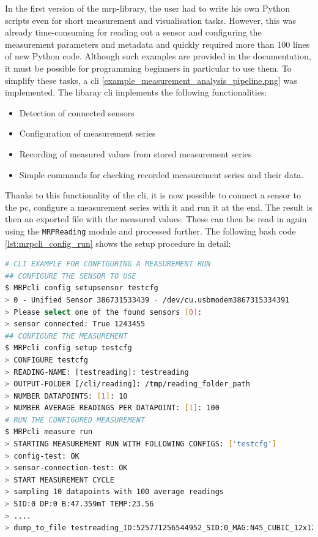 In the first version of the \gls{mrp}-library, the user had to write his
own Python scripts even for short measurement and visualisation tasks.
However, this was already time-consuming for reading out a sensor and
configuring the measurement parameters and metadata and quickly required
more than 100 lines of new Python code. Although such examples are
provided in the documentation, it must be possible for programming
beginners in particular to use them. To simplify these tasks, a
\gls{cli} \ref{example_measurement_analysis_pipeline.png} was
implemented. The libaray \gls{cli} implements the following
functionalities:

\begin{itemize}
\tightlist
\item
  Detection of connected sensors
\item
  Configuration of measurement series
\item
  Recording of measured values from stored measurement series
\item
  Simple commands for checking recorded measurement series and their
  data.
\end{itemize}

Thanks to this functionality of the \gls{cli}, it is now possible to
connect a sensor to the \gls{pc}, configure a measurement series with it
and run it at the end. The result is then an exported file with the
measured values. These can then be read in again using the
\passthrough{\lstinline!MRPReading!} module and processed further. The
following bash code \ref{lst:mrpcli_config_run} shows the setup
procedure in detail:

\begin{lstlisting}[language=bash, caption={CLI example for configuring a measurement run}, label=lst:mrpcli_config_run]
# CLI EXAMPLE FOR CONFIGURING A MEASUREMENT RUN
## CONFIGURE THE SENSOR TO USE
$ MRPcli config setupsensor testcfg
> 0 - Unified Sensor 386731533439 - /dev/cu.usbmodem3867315334391
> Please select one of the found sensors [0]:
> sensor connected: True 1243455
## CONFIGURE THE MEASUREMENT
$ MRPcli config setup testcfg
> CONFIGURE testcfg
> READING-NAME: [testreading]: testreading
> OUTPUT-FOLDER [/cli/reading]: /tmp/reading_folder_path
> NUMBER DATAPOINTS: [1]: 10
> NUMBER AVERAGE READINGS PER DATAPOINT: [1]: 100
# RUN THE CONFIGURED MEASUREMENT
$ MRPcli measure run
> STARTING MEASUREMENT RUN WITH FOLLOWING CONFIGS: ['testcfg']
> config-test: OK
> sensor-connection-test: OK
> START MEASUREMENT CYCLE
> sampling 10 datapoints with 100 average readings
> SID:0 DP:0 B:47.359mT TEMP:23.56
> ....
> dump_to_file testreading_ID:525771256544952_SID:0_MAG:N45_CUBIC_12x12x12.mag.json
\end{lstlisting}

